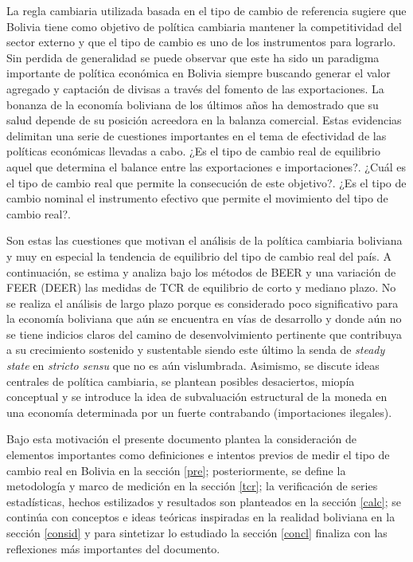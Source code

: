 \documentclass[12pt,letterpaper]{article}
\begin{document}
La regla cambiaria utilizada basada en el tipo de cambio de referencia sugiere que Bolivia tiene como objetivo de política cambiaria mantener la competitividad del sector externo y que el tipo de cambio es uno de los instrumentos para lograrlo. Sin perdida de generalidad se puede observar que este ha sido un paradigma importante de política económica en Bolivia siempre buscando generar el valor agregado y captación de divisas a través del fomento de las exportaciones. La bonanza de la economía boliviana de los últimos años ha demostrado que su salud depende de su posición acreedora en la balanza comercial. Estas evidencias delimitan una serie de cuestiones importantes en el tema de efectividad de las políticas económicas llevadas a cabo. ¿Es el tipo de cambio real de equilibrio aquel que determina el balance entre las exportaciones e importaciones?. ¿Cuál es el tipo de cambio real que permite la consecución de este objetivo?. ¿Es el tipo de cambio nominal el instrumento efectivo que permite el movimiento del tipo de cambio real?. 

Son estas las cuestiones que motivan el análisis de la política cambiaria boliviana y muy en especial la tendencia de equilibrio del tipo de cambio real del país. A continuación, se estima y analiza bajo los métodos de BEER y una variación de FEER (DEER) las medidas de TCR de equilibrio de corto y mediano plazo. No se realiza el análisis de largo plazo porque es considerado poco significativo para la economía boliviana que aún se encuentra en vías de desarrollo y donde aún no se tiene indicios claros del camino de desenvolvimiento pertinente que contribuya a su crecimiento sostenido y sustentable siendo este último la senda de \emph{steady state} en \emph{stricto sensu} que no es aún vislumbrada. Asimismo, se discute ideas centrales de política cambiaria, se plantean posibles desaciertos, miopía conceptual y se introduce la idea de subvaluación estructural de la moneda en una economía determinada por un fuerte contrabando (importaciones ilegales).

Bajo esta motivación el presente documento plantea la consideración de elementos importantes como definiciones e intentos previos de medir el tipo de cambio real en Bolivia en la sección \ref{pre}; posteriormente, se define la metodología y marco de medición en la sección \ref{tcr}; la verificación de series estadísticas, hechos estilizados y resultados son planteados en la sección \ref{calc}; se continúa con conceptos e ideas teóricas inspiradas en la realidad boliviana en la sección \ref{consid} y para sintetizar lo estudiado la sección \ref{concl} finaliza con las reflexiones más importantes del documento.
\end{document}
